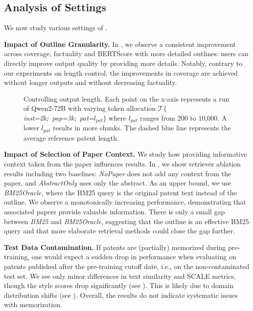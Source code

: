 \subsection{Analysis of \MethodName Settings}

We now study various settings of \MethodName.


\noindent\textbf{Impact of Outline Granularity.}
In , we observe a consistent improvement across coverage, factuality and BERTScore with more detailed outlines:
users can directly improve output quality by providing more details. %
Notably, contrary to our experiments on length control, the improvements in coverage are achieved without longer outputs and without decreasing factuality.


\begin{figure}[t]
  
  \caption{
    Controlling output length.
    Each point on the x-axis represents a run of Qwen2-72B with varying token allocation \mbox{$\mathcal{T}$\textit{$\{$inst=2k; pap=3k; pat=$l_{pat}\}$}} where $l_{pat}$ ranges from 200 to 10,000. 
    A lower $l_{pat}$ results in more chunks. 
    The dashed blue line represents the average reference patent length. 
  }
  \label{fig:length_control}
\end{figure}


\noindent\textbf{Impact of Selection of Paper Context.}
We study how providing informative context taken from the paper influences results.
In , we show retriever ablation results including two baselines: 
\textit{NoPaper} does not add any context from the paper, and \textit{AbstractOnly} uses only the abstract.
As an upper bound, we use \textit{BM25Oracle,} where the BM25 query is the original patent text instead of the outline.
We observe a monotonically increasing performance, demonstrating that associated papers provide valuable information.
There is only a small gap between \textit{BM25} and \textit{BM25Oracle}, suggesting that the outline is an effective BM25 query and that more elaborate retrieval methods could close the gap further.

\noindent\textbf{Test Data Contamination. }
If patents are (partially) memorized during pre-training, one would expect a sudden drop in performance when evaluating on patents published after the pre-training cutoff date, i.e., on the non-contaminated test set.
We see only minor differences in text similarity and SCALE metrics, though the style scores drop significantly (see ). 
This is likely due to domain distribution shifts (see ).
Overall, the results do not indicate systematic issues with memorization.


